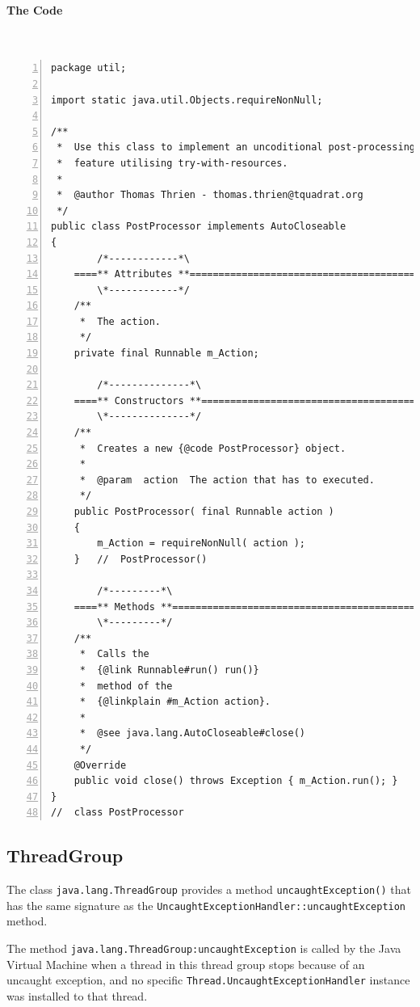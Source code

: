 \documentclass[11pt,a4paper, titlepage, parskip=half, headsepline, footsepline, cleardoublepage=current, headheight=1cm]{scrbook}
\begin{document}
\paragraph{The Code} \
\begin{lstlisting}[numbers=left,caption={PostProcessor.java}]
package util;

import static java.util.Objects.requireNonNull;

/**
 *  Use this class to implement an uncoditional post-processing
 *  feature utilising try-with-resources.
 *
 *  @author Thomas Thrien - thomas.thrien@tquadrat.org
 */
public class PostProcessor implements AutoCloseable
{
        /*------------*\
    ====** Attributes **=============================================
        \*------------*/
    /**
     *  The action.
     */
    private final Runnable m_Action;
    
        /*--------------*\
    ====** Constructors **===========================================
        \*--------------*/
    /**
     *  Creates a new {@code PostProcessor} object.
     *
     *  @param  action  The action that has to executed.
     */
    public PostProcessor( final Runnable action )
    {
        m_Action = requireNonNull( action );
    }   //  PostProcessor()
    
        /*---------*\
    ====** Methods **================================================
        \*---------*/
    /**
     *  Calls the
     *  {@link Runnable#run() run()}
     *  method of the
     *  {@linkplain #m_Action action}.
     *
     *  @see java.lang.AutoCloseable#close()
     */
    @Override
    public void close() throws Exception { m_Action.run(); }
}
//  class PostProcessor
\end{lstlisting}

\subsection{ThreadGroup}\label{sec:ThreadGroup}
The class \lstinline|java.lang.ThreadGroup|\autocite{ORACLE_DOC_THREADGROUP_CLASS} provides a method \lstinline|uncaughtException()| that has the same signature as the \lstinline|UncaughtExceptionHandler::uncaughtException|\autocite{ORACLE_DOC_UNCAUGHTEXCEPTIONHANDLER:uncaughtException} method.

The method \lstinline|java.lang.ThreadGroup:uncaughtException| is called by the Java Virtual Machine when a thread in this thread group stops because of an uncaught exception, and no specific \lstinline|Thread.UncaughtExceptionHandler|\autocite{ORACLE_DOC_UNCAUGHTEXCEPTIONHANDLER_INTERFACE} instance was installed
to that thread.
\end{document}
